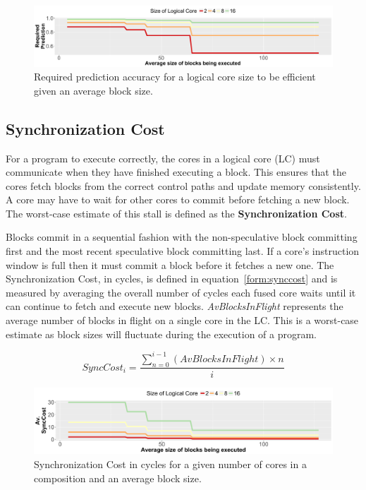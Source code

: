 \begin{figure}[h]
    \centering
    \includegraphics[width=\textwidth]{cases-paper/graphics/limit_study/prediction_req.pdf}
    \caption{Required prediction accuracy for a logical core size to be efficient given an average block size.}
    \label{fig:req_pred}
\end{figure}
\subsection{Synchronization Cost}


For a program to execute correctly, the cores in a logical core (LC) must communicate when they have finished executing a block. 
This ensures that the cores fetch blocks from the correct control paths and update memory consistently.
A core may have to wait for other cores to commit before fetching a new block. 
The worst-case estimate of this stall is defined as the \textbf{Synchronization Cost}.

Blocks commit in a sequential fashion with the non-speculative block committing first and the most recent speculative block committing last.
If a core's instruction window is full then it must commit a block before it fetches a new one.
The Synchronization Cost, in cycles, is defined in equation~\ref{form:synccost} and is measured by averaging the overall number of cycles each fused core waits until it can continue to fetch and execute new blocks.
\textit{AvBlocksInFlight} represents the average number of blocks in flight on a single core in the LC.
This is a worst-case estimate as block sizes will fluctuate during the execution of a program.

\begin{equation}\label{form:synccost}
SyncCost_i = \frac{\sum_{n=0}^{i-1}\left(AvBlocksInFlight \right) \times n }{i}
\end{equation}


\begin{figure}[h]
    \centering
    \includegraphics[width=\textwidth]{cases-paper/graphics/limit_study/sync_cost.pdf}

    \caption{Synchronization Cost in cycles for a given number of cores in a composition and an average block size.} %
    \label{fig:sync_cost}
\end{figure}


